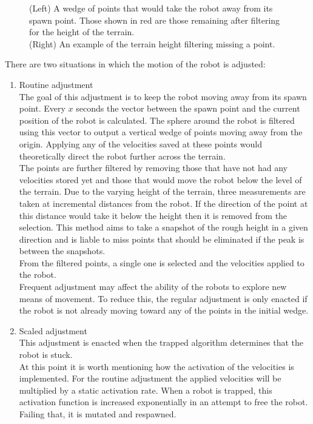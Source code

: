 \documentclass{article}
\begin{document}
\begin{figure}[H]
\begin{minipage}[t]{0.65\textwidth}
\vspace*{-3mm}
\caption{(Left) A wedge of points that would take the robot away from its spawn point. Those shown in red are those remaining after filtering for the height of the terrain.\\
(Right) An example of the terrain height filtering missing a point.} 
\end{minipage}
\end{figure}

\noindent There are two situations in which the motion of the robot is adjusted:
\begin{enumerate}
\item Routine adjustment\\
The goal of this adjustment is to keep the robot moving away from its spawn point. Every $x$ seconds the vector between the spawn point and the current position of the robot is calculated. The sphere around the robot is filtered using this vector to output a vertical wedge of points moving away from the origin. Applying any of the velocities saved at these points would theoretically direct the robot further across the terrain. \\
The points are further filtered by removing those that have not had any velocities stored yet and those that would move the robot below the level of the terrain. Due to the varying height of the terrain, three measurements are taken at incremental distances from the robot. If the direction of the point at this distance would take it below the height then it is removed from the selection. This method aims to take a snapshot of the rough height in a given direction and is liable to miss points that should be eliminated if the peak is between the snapshots. \\
From the filtered points, a single one is selected and the velocities applied to the robot. \\
Frequent adjustment may affect the ability of the robots to explore new means of movement. To reduce this, the regular adjustment is only enacted if the robot is not already moving toward any of the points in the initial wedge. 
\item Scaled adjustment\\
This adjustment is enacted when the trapped algorithm determines that the robot is stuck.\\
At this point it is worth mentioning how the activation of the velocities is implemented. For the routine adjustment the applied velocities will be multiplied by a static activation rate. When a robot is trapped, this activation function is increased exponentially in an attempt to free the robot. Failing that, it is mutated and respawned. 

\end{enumerate}
\end{document}
